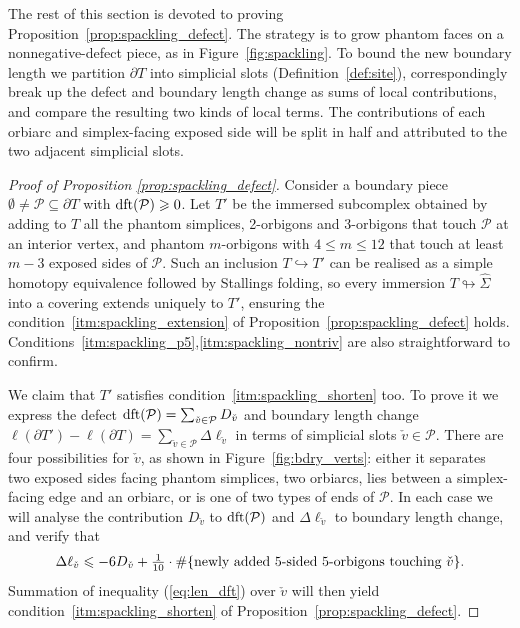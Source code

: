 \documentclass{amsart}
\newcommand{\dft}{\textnormal{dft}}
\newcommand{\tn}{\textnormal}
\newcommand{\whS}{{\widehat{\Sigma}}}
\begin{document}
\smallskip

The rest of this section is devoted to proving Proposition~\ref{prop:spackling_defect}. The strategy is to grow phantom faces on a nonnegative-defect piece, as in Figure~\ref{fig:spackling}. To bound the new boundary length we partition $\partial T$ into simplicial slots (Definition~\ref{def:site}), correspondingly break up the defect and boundary length change as sums of local contributions, and compare the resulting two kinds of local terms. The contributions of each orbiarc and simplex-facing exposed side will be split in half and attributed to the two adjacent simplicial slots.
\begin{proof}[Proof of Proposition \ref{prop:spackling_defect}]
Consider a boundary piece $\emptyset\neq\mathcal{P}\subseteq\partial T$ with $\dft(\mathcal{P})\geqslant0$. Let $T'$ be the immersed subcomplex obtained by adding to $T$ all the phantom simplices, 2-orbigons and 3-orbigons that touch $\mathcal{P}$ at an interior vertex, and phantom $m$-orbigons with $4\leqslant m\leqslant12$ that touch at least $m-3$ exposed sides of $\mathcal{P}$. Such an inclusion $T\hookrightarrow T'$ can be realised as a simple homotopy equivalence followed by Stallings folding, so every immersion $T\looparrowright\whS$ into a covering extends uniquely to $T'$, ensuring the condition~\ref*{itm:spackling_extension} of Proposition~\ref{prop:spackling_defect} holds. Conditions~\ref*{itm:spackling_p5},\ref*{itm:spackling_nontriv} are also straightforward to confirm.

We claim that $T'$ satisfies condition~\ref*{itm:spackling_shorten} too. To prove it we express the defect $\dft(\mathcal{P})=\sum_{\check{v}\in\mathcal{P}}D_{\check{v}}$ and boundary length change $\ell(\partial T')-\ell(\partial T)=\sum_{\check{v}\in\mathcal{P}}\Delta\ell_{\check{v}}$ in terms of simplicial slots $\check{v}\in\mathcal{P}$. There are four possibilities for $\check{v}$, as shown in Figure~\ref{fig:bdry_verts}: either it separates two exposed sides facing phantom simplices, two orbiarcs, lies between a simplex-facing edge and an orbiarc, or is one of two types of ends of $\mathcal{P}$. In each case we will analyse the contribution $D_{\check{v}}$ to $\tn{dft}(\mathcal{P})$ and $\Delta\ell_{\check{v}}$ to boundary length change, and verify that
\begin{equation}\label{eq:len_dft}
\Delta\ell_{\check{v}}\leqslant-6D_{\check{v}}+\tfrac{1}{10}\cdot\#\{\text{newly added }5\text{-sided }5\tn{-orbigons touching }\check{v}\}.
\end{equation}
Summation of inequality (\ref{eq:len_dft}) over $\check{v}$ will then yield condition~\ref*{itm:spackling_shorten} of Proposition~\ref{prop:spackling_defect}.


\end{proof}
\end{document}
